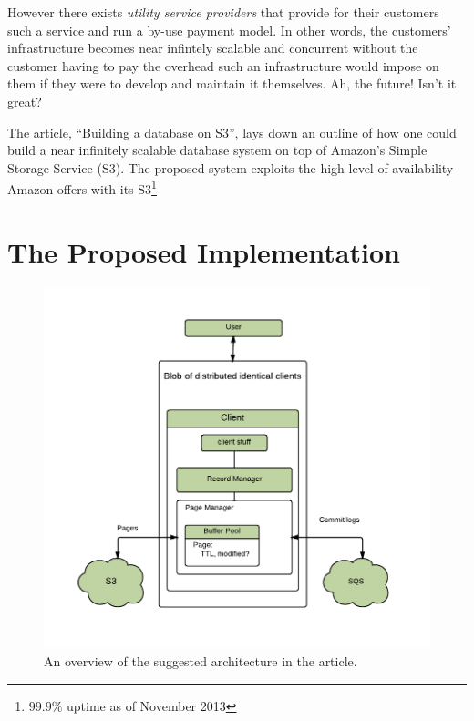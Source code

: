 \documentclass[11pt]{article}
\begin{document}
However there exists \textit{utility service providers} that provide for their customers such a service and run a by-use payment model.
In other words, the customers' infrastructure becomes near infintely scalable and concurrent without the customer having to pay the overhead such an infrastructure would impose on them if they were to develop and maintain it themselves.
Ah, the future! Isn't it great?

The article, ``Building a database on S3'', lays down an outline of how one could build a near infinitely scalable database system on top of Amazon's Simple Storage Service (S3).
The proposed system exploits the high level of availability Amazon offers with its S3\footnote{$99.9\%$ uptime as of November 2013}

\section{The Proposed Implementation}
\begin{figure}[H]
	\begin{center}
		\includegraphics{img/proposed-architecture.pdf}
		\caption{An overview of the suggested architecture in the article.}
		\label{figure:proposed-architecture}
	\end{center}
\end{figure}
\end{document}
